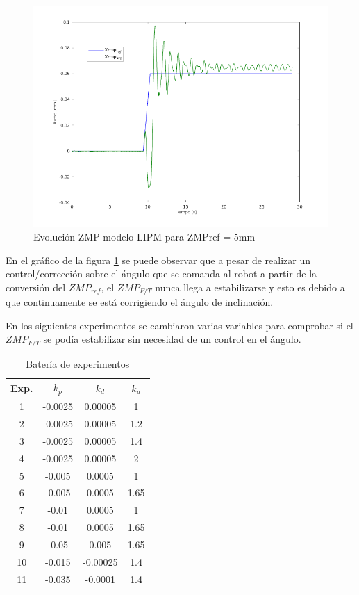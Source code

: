 
\begin{figure}[H]
\centering
\includegraphics[width=1\textwidth]{imagenes/apartado_5/5.1/54_evolucion_zmpref_5mm}
\caption{Evolución ZMP modelo LIPM para ZMPref = 5mm}
\label{figura54}
\end{figure}

En el gráfico de la figura \ref{figura54} se puede observar que a pesar de realizar un control/corrección sobre el ángulo que se comanda al robot a partir de la conversión del $ZMP_{ref}$, el $ZMP_{F/T}$ nunca llega a estabilizarse y esto es debido a que continuamente se está corrigiendo el ángulo de inclinación.

En los siguientes experimentos se cambiaron varias variables para comprobar si el $ZMP_{F/T}$ se podía estabilizar sin necesidad de un control en el ángulo.

\begin{table}[H]
\begin{center}
\begin{tabular}{|c|c|c|c|}
\hline
Exp. & $k_p$    & $k_d$    & $k_u$ \\ \hline
1    & -0.0025 & 0.00005  & 1    \\ \hline
2    & -0.0025 & 0.00005  & 1.2  \\ \hline
3    & -0.0025 & 0.00005  & 1.4  \\ \hline
4    & -0.0025 & 0.00005  & 2    \\ \hline
5    & -0.005  & 0.0005   & 1    \\ \hline
6    & -0.005  & 0.0005   & 1.65 \\ \hline
7    & -0.01   & 0.0005   & 1    \\ \hline
8    & -0.01   & 0.0005   & 1.65 \\ \hline
9    & -0.05   & 0.005    & 1.65 \\ \hline
10   & -0.015  & -0.00025 & 1.4  \\ \hline
11   & -0.035  & -0.0001  & 1.4  \\ \hline
\end{tabular}
\end{center}
\caption{Batería de experimentos}
\label{tabla51}
\end{table}

